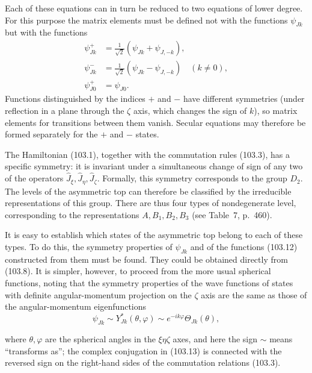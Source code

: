 Each of these equations can in turn be reduced to two equations of lower degree. For this purpose the matrix elements must be defined not with the functions $\psi_{Jk}$ but with the functions
\begin{equation}
 \begin{aligned}
 \psi_{Jk}^{+}&=\frac1{\sqrt2}(\psi_{Jk}+\psi_{J,-k}),\\
 \psi_{Jk}^{-}&=\frac1{\sqrt2}(\psi_{Jk}-\psi_{J,-k})\quad(k\ne0),\\
 \psi_{J0}^{+}&=\psi_{J0}.
 \end{aligned} \tag{103.12}
\end{equation}
Functions distinguished by the indices $+$ and $-$ have different symmetries (under reflection in a plane through the $\zeta$ axis, which changes the sign of $k$), so matrix elements for transitions between them vanish. Secular equations may therefore be formed separately for the $+$ and $-$ states.

The Hamiltonian (103.1), together with the commutation rules (103.3), has a specific symmetry: it is invariant under a simultaneous change of sign of any two of the operators $\hat J_\xi,\hat J_\eta,\hat J_\zeta$. Formally, this symmetry corresponds to the group $D_2$. The levels of the asymmetric top can therefore be classified by the irreducible representations of this group. There are thus four types of nondegenerate level, corresponding to the representations $A,B_1,B_2,B_3$ (see Table~7, p.~460).

It is easy to establish which states of the asymmetric top belong to each of these types. To do this, the symmetry properties of $\psi_{Jk}$ and of the functions (103.12) constructed from them must be found. They could be obtained directly from (103.8). It is simpler, however, to proceed from the more usual spherical functions, noting that the symmetry properties of the wave functions of states with definite angular-momentum projection on the $\zeta$ axis are the same as those of the angular-momentum eigenfunctions
\begin{equation}
 \psi_{Jk}\sim Y_{Jk}^*(\theta,\varphi)\sim e^{-ik\varphi}\Theta_{Jk}(\theta), \tag{103.13}
\end{equation}

where $\theta,\varphi$ are the spherical angles in the $\xi\eta\zeta$ axes, and here the sign $\sim$ means ``transforms as''; the complex conjugation in (103.13) is connected with the reversed sign on the right-hand sides of the commutation relations (103.3).

